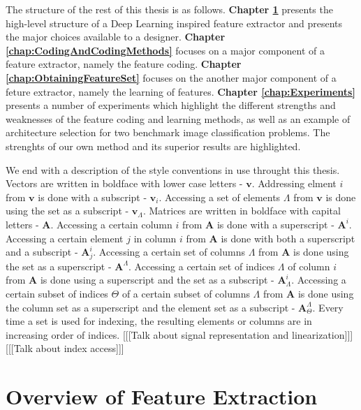\documentclass[12pt,a4paper,oneside,english]{UPBThesis}
\begin{document}
The structure of the rest of this thesis is as follows. \textbf{Chapter \ref{chap:OverviewFeatureExtraction}} presents the high-level structure of a Deep Learning inspired feature extractor and presents the major choices available to a designer. \textbf{Chapter \ref{chap:CodingAndCodingMethods}} focuses on a major component of a feature extractor, namely the feature coding. \textbf{Chapter \ref{chap:ObtainingFeatureSet}} focuses on the another major component of a feture extractor, namely the learning of features. \textbf{Chapter \ref{chap:Experiments}} presents a number of experiments which highlight the different strengths and weaknesses of the feature coding and learning methods, as well as an example of architecture selection for two benchmark image classification problems. The strenghts of our own method and its superior results are highlighted.

We end with a description of the style conventions in use throught this thesis. Vectors are written in boldface with lower case letters - $\textbf{v}$. Addressing elment $i$ from $\textbf{v}$ is done with a subscript - $\textbf{v}_i$. Accessing a set of elements $\Lambda$ from $\textbf{v}$ is done using the set as a subscript - $\textbf{v}_\Lambda$. Matrices are written in boldface with capital letters - $\textbf{A}$. Accessing a certain column $i$ from $\textbf{A}$ is done with a superscript - $\textbf{A}^i$. Accessing a certain element $j$ in column $i$ from $\textbf{A}$ is done with both a superscript and a subscript - $\textbf{A}^i_j$. Accessing a certain set of columns $\Lambda$ from $\textbf{A}$ is done using the set as a superscript - $\textbf{A}^\Lambda$. Accessing a certain set of indices $\Lambda$ of column $i$ from $\textbf{A}$ is done using a superscript and the set as a subscript - $\textbf{A}^i_\Lambda$. Accessing a certain subset of indices $\Theta$ of a certain subset of columns $\Lambda$ from $\textbf{A}$ is done using the column set as a superscript and the element set as a subscript - $\textbf{A}^\Lambda_\Theta$. Every time a set is used for indexing, the resulting elements or columns are in increasing order of indices. [[[Talk about signal representation and linearization]]] [[[Talk about index access]]]

\chapter{Overview of Feature Extraction}
\label{chap:OverviewFeatureExtraction}
\end{document}
